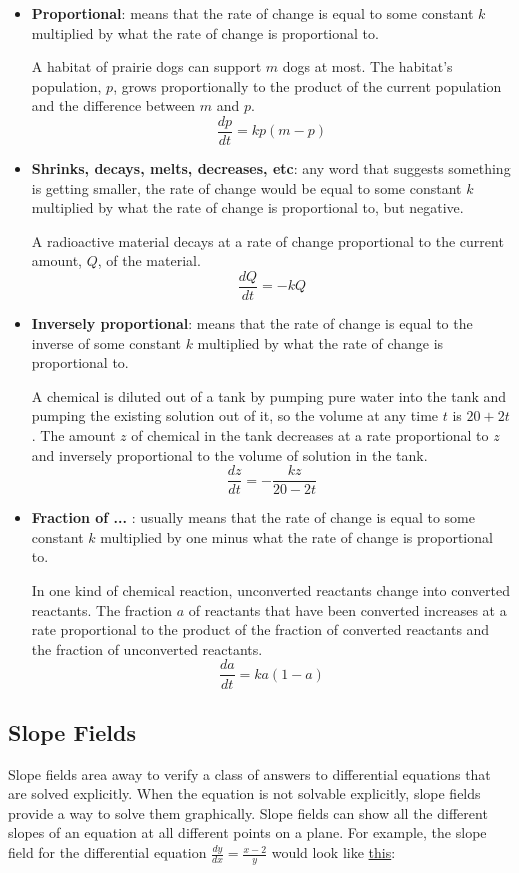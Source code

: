 \documentclass[12pt]{article}
\begin{document}
\begin{itemize}
	\item \textbf{Proportional}: means that the rate of change is equal to some constant $k$ multiplied by what the rate of change is proportional to.
	      \bigskip

	      \noindent A habitat of prairie dogs can support $m$ dogs at most. The habitat's population, $p$, grows proportionally to the product of the current population and the difference between $m$ and $p$.
	      \[ \frac{dp}{dt} = kp(m-p) \]

	\item \textbf{Shrinks, decays, melts, decreases, etc}: any word that suggests something is getting smaller, the rate of change would be equal to some constant $k$ multiplied by what the rate of change is proportional to, but negative.
	      \bigskip

	      \noindent A radioactive material decays at a rate of change proportional to the current amount, $Q$, of the material.
	      \[ \frac{dQ}{dt} = -kQ \]

	\item \textbf{Inversely proportional}: means that the rate of change is equal to the inverse of some constant $k$ multiplied by what the rate of change is proportional to.
	      \bigskip

	      \noindent A chemical is diluted out of a tank by pumping pure water into the tank and pumping the existing solution out of it, so the volume at any time $t$ is $20+2t$. The amount $z$ of chemical in the tank decreases at a rate proportional to $z$ and inversely proportional to the volume of solution in the tank.
	      \[ \frac{dz}{dt} = -\frac{kz}{20-2t} \]

	\item \textbf{Fraction of ... }: usually means that the rate of change is equal to some constant $k$ multiplied by one minus what the rate of change is proportional to.
	      \bigskip

	      \noindent In one kind of chemical reaction, unconverted reactants change into converted reactants. The fraction $a$ of reactants that have been converted increases at a rate proportional to the product of the fraction of converted reactants and the fraction of unconverted reactants.
	      \[ \frac{da}{dt} = ka(1-a) \]
\end{itemize}

\subsection{Slope Fields}
Slope fields area away to verify a class of answers to differential equations that are solved explicitly. When the equation is not solvable explicitly, slope fields provide a way to solve them graphically. Slope fields can show all the different slopes of an equation at all different points on a plane. For example, the slope field for the differential equation $\frac{dy}{dx} = \frac{x-2}{y}$ would look like \hyperref[fig:slopefield1]{this}:
\end{document}
